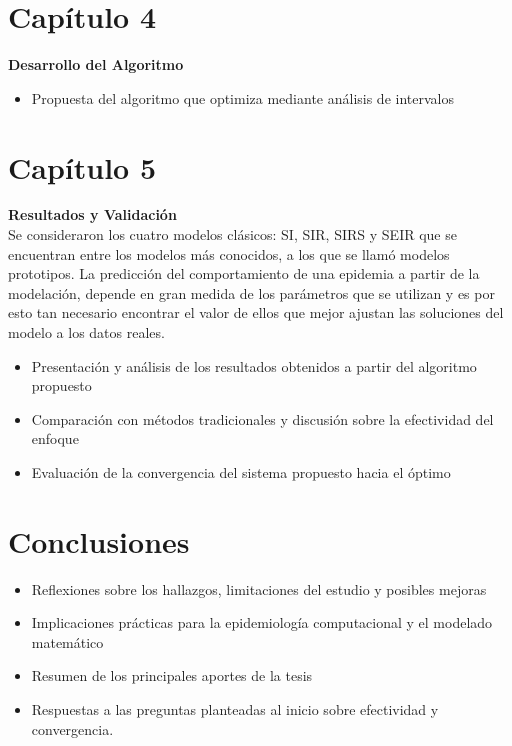 \documentclass{article}
\begin{document}
\newpage

\section*{ \Huge Capítulo 4}
\label{sec:16}
    \large \textbf{ Desarrollo del Algoritmo }
    \begin{itemize}
        \item  Propuesta del algoritmo que optimiza mediante análisis de intervalos
    \end{itemize}

\newpage

\section*{ \Huge Capítulo 5 } 
\label{sec:17}
    \large \textbf{ Resultados y Validación } \\

    Se consideraron los cuatro modelos clásicos:
    SI, SIR, SIRS y SEIR que se encuentran entre los modelos más conocidos, a los
    que se llamó modelos prototipos.
    La predicción del comportamiento de una epidemia a partir de la modelación,
    depende en gran medida de los parámetros que se utilizan y es por esto tan
    necesario encontrar el valor de ellos que mejor ajustan las soluciones del modelo
    a los datos reales. \\
    
    \begin{itemize}
        \item  Presentación y análisis de los resultados obtenidos a partir del algoritmo propuesto
        \item  Comparación con métodos tradicionales y discusión sobre la efectividad del enfoque
        \item  Evaluación de la convergencia del sistema propuesto hacia el óptimo
    \end{itemize}

\newpage
    
    \section*{ \Huge Conclusiones } 
    \label{sec:19}
    \begin{itemize}
        \item  Reflexiones sobre los hallazgos, limitaciones del estudio y posibles mejoras
        \item  Implicaciones prácticas para la epidemiología computacional y el modelado matemático
       \item  Resumen de los principales aportes de la tesis
        \item  Respuestas a las preguntas planteadas al inicio sobre efectividad y convergencia.
    \end{itemize} 
\end{document}
